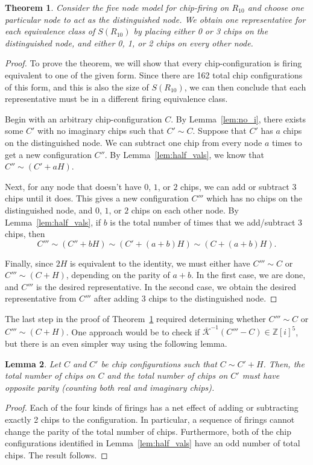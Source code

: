 \documentclass[12p]{amsart}
\numberwithin{equation}{section}
\theoremstyle{plain}
\newtheorem{thm}{Theorem}[section]
\newtheorem{lemma}[thm]{Lemma}
\theoremstyle{definition}
\begin{document}
\begin{thm}\label{thm:representatives}
    Consider the five node model for chip-firing on $R_{10}$ and choose one particular node to act as \emph{the distinguished node}. We obtain one representative for each equivalence class of $S(R_{10})$ by placing either 0 or 3 chips on the distinguished node, and either 0, 1, or 2 chips on every other node. 
\end{thm}
\begin{proof}
    To prove the theorem, we will show that every chip-configuration is firing equivalent to one of the given form. Since there are 162 total chip configurations of this form, and this is also the size of $S(R_{10})$, we can then conclude that each representative must be in a different firing equivalence class.
    
    Begin with an arbitrary chip-configuration $C$. By Lemma~\ref{lem:no_i}, there exists some $C'$ with no imaginary chips such that $C' \sim C$. Suppose that $C'$ has $a$ chips on the distinguished node. We can subtract one chip from every node $a$ times to get a new configuration $C''$. By Lemma~\ref{lem:half_vals}, we know that $C'' \sim (C' + aH)$. 

    Next, for any node that doesn't have $0$, $1$, or $2$ chips, we can add or subtract 3 chips until it does. This gives a new configuration $C'''$ which has no chips on the distinguished node, and $0$, $1$, or $2$ chips on each other node. By Lemma~\ref{lem:half_vals}, if $b$ is the total number of times that we add/subtract $3$ chips, then \[C''' \sim (C'' + bH) \sim (C' + (a+b)H) \sim (C + (a+b)H).\]

    Finally, since $2H$ is equivalent to the identity, we must either have $C''' \sim C$ or $C''' \sim (C + H)$, depending on the parity of $a+b$. In the first case, we are done, and $C'''$ is the desired representative. In the second case, we obtain the desired representative from $C'''$ after adding $3$ chips to the distinguished node. 
\end{proof}

The last step in the proof of Theorem~\ref{thm:representatives} required determining whether $C''' \sim C$ or $C''' \sim (C + H)$. One approach would be to check if $\overline{\mathcal K}^{-1}(C''' - C) \in \mathbb Z[i]^5$, but there is an even simpler way using the following lemma. 

\begin{lemma}\label{lem:parity}
    Let $C$ and $C'$ be chip configurations such that $C \sim C' + H$. Then, the total number of chips on $C$ and the total number of chips on $C'$ must have opposite parity (counting both real and imaginary chips). 
\end{lemma}
\begin{proof}
    Each of the four kinds of firings has a net effect of adding or subtracting exactly 2 chips to the configuration. In particular, a sequence of firings cannot change the parity of the total number of chips. Furthermore, both of the chip configurations identified in Lemma~\ref{lem:half_vals} have an odd number of total chips. The result follows. 
\end{proof}
\end{document}
